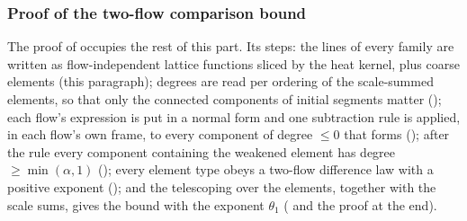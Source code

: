 
\subsubsection*{Proof of the two-flow comparison bound}

The proof of  occupies the rest of this part. Its steps: the lines of every family are written as flow-independent lattice functions sliced by the heat kernel, plus coarse elements (this paragraph); degrees are read per ordering of the scale-summed elements, so that only the connected components of initial segments matter (); each flow's expression is put in a normal form and one subtraction rule is applied, in each flow's own frame, to every component of degree $\le0$ that forms (); after the rule every component containing the weakened element has degree $\ge\min(\alpha,1)$ (); every element type obeys a two-flow difference law with a positive exponent (); and the telescoping over the elements, together with the scale sums, gives the bound with the exponent $\theta_1$ ( and the proof at the end).

